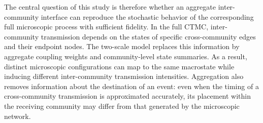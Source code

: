 \documentclass[a4paper,fleqn]{cas-sc}
\begin{document}

The central question of this study is therefore whether an aggregate inter-community interface can reproduce the stochastic behavior of the corresponding full microscopic process with sufficient fidelity. In the full CTMC, inter-community transmission depends on the states of specific cross-community edges and their endpoint nodes. The two-scale model replaces this information by aggregate coupling weights and community-level state summaries. As a result, distinct microscopic configurations can map to the same macrostate while inducing different inter-community transmission intensities. Aggregation also removes information about the destination of an event: even when the timing of a cross-community transmission is approximated accurately, its placement within the receiving community may differ from that generated by the microscopic network.

\end{document}
